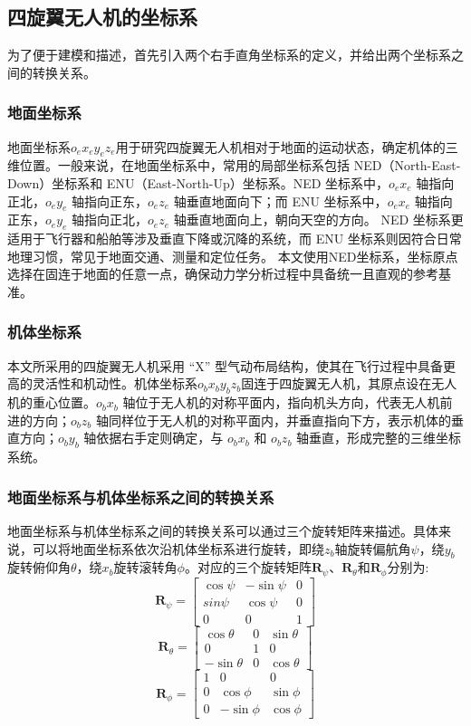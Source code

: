 \documentclass[lang=chs, degree=master, blindreview=false, winfonts=true]{yanputhesis}
\begin{document}
\subsection{四旋翼无人机的坐标系}
为了便于建模和描述，首先引入两个右手直角坐标系的定义，并给出两个坐标系之间的转换关系。
\subsubsection{地面坐标系}
地面坐标系$o_ex_ey_ez_e$用于研究四旋翼无人机相对于地面的运动状态，确定机体的三维位置。一般来说，在地面坐标系中，常用的局部坐标系包括 NED（North-East-Down）坐标系和 ENU（East-North-Up）坐标系。NED 坐标系中，$o_ex_e$ 轴指向正北，$o_ey_e$ 轴指向正东，$o_ez_e$ 轴垂直地面向下；而 ENU 坐标系中，$o_ex_e$ 轴指向正东，$o_ey_e$ 轴指向正北，$o_ez_e$ 轴垂直地面向上，朝向天空的方向。
NED 坐标系更适用于飞行器和船舶等涉及垂直下降或沉降的系统，而 ENU 坐标系则因符合日常地理习惯，常见于地面交通、测量和定位任务。
本文使用NED坐标系，坐标原点选择在固连于地面的任意一点，确保动力学分析过程中具备统一且直观的参考基准。

\subsubsection{机体坐标系}
本文所采用的四旋翼无人机采用 “X” 型气动布局结构，使其在飞行过程中具备更高的灵活性和机动性。机体坐标系$o_bx_by_bz_b$固连于四旋翼无人机，其原点设在无人机的重心位置。$o_bx_b$ 轴位于无人机的对称平面内，指向机头方向，代表无人机前进的方向；$o_bz_b$ 轴同样位于无人机的对称平面内，并垂直指向下方，表示机体的垂直方向；$o_by_b$ 轴依据右手定则确定，与 $o_bx_b$ 和 $o_bz_b$ 轴垂直，形成完整的三维坐标系统。

\subsubsection{地面坐标系与机体坐标系之间的转换关系}
地面坐标系与机体坐标系之间的转换关系可以通过三个旋转矩阵来描述。具体来说，可以将地面坐标系依次沿机体坐标系进行旋转，即绕$z_b$轴旋转偏航角$\psi$，绕$y_b$旋转俯仰角$\theta$，绕$x_b$旋转滚转角$\phi$。对应的三个旋转矩阵$\boldsymbol{R}_\psi$、$\boldsymbol{R}_\theta$和$\boldsymbol{R}_\phi$分别为:
$$
\boldsymbol{R}_\psi=\begin{bmatrix}\cos\psi&-\sin\psi&0\\sin\psi&\cos\psi&0\\0&0&1\end{bmatrix} $$
$$	\boldsymbol{R}_\theta=\begin{bmatrix}\cos\theta&0&\sin\theta\\0&1&0\\-\sin\theta&0&\cos\theta\end{bmatrix} $$
$$\boldsymbol{R}_\phi=\begin{bmatrix}1&0&0\\0&\cos\phi&\sin\phi\\0&-\sin\phi&\cos\phi\end{bmatrix}
$$
\end{document}
